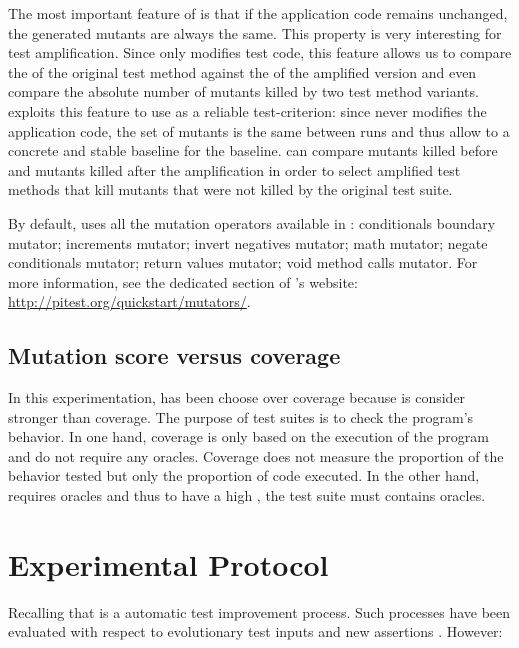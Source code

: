 The most important feature of \pitest is that if the application code remains unchanged, the generated mutants are always the same.
This property is very interesting for test amplification.
Since \dspot only modifies test code, this feature allows us to compare the \ms of the original test method against the \ms of the amplified version and even compare the absolute number of mutants killed by two test method variants. 
\dspot exploits this feature to use \ms as a reliable test-criterion:
since \dspot never modifies the application code, the set of mutants is the same between runs and thus allow \dspot to a concrete and stable baseline for the baseline.
\dspot can compare mutants killed before and mutants killed after the amplification in order to select amplified test methods that kill mutants that were not killed by the original test suite.

By default, \dspot uses all the mutation operators available in \pitest: 
conditionals boundary mutator;
increments mutator;
invert negatives mutator;
math mutator;
negate conditionals mutator;
return values mutator;
void method calls mutator.
For more information, see the dedicated section of \pitest's website: \url{http://pitest.org/quickstart/mutators/}.

\subsection{Mutation score versus coverage}
\label{subsec:test-improvement:introduction:mutation-score-vs-coverage}
In this experimentation, \ms has been choose over coverage because \ms is consider stronger than coverage.
The purpose of test suites is to check the program's behavior.
In one hand, coverage is only based on the execution of the program and do not require any oracles.
Coverage does not measure the proportion of the behavior tested but only the proportion of code executed.
In the other hand, \ms requires oracles and thus to have a high \ms, the test suite must contains oracles.

\section{Experimental  Protocol}
\label{sec:test-improvement:experiment-protocol}

Recalling that \dspot is a automatic test improvement process.
Such processes have been evaluated with respect to evolutionary test inputs \cite{tonella} and new assertions \cite{TaoXie2006}.
However:

